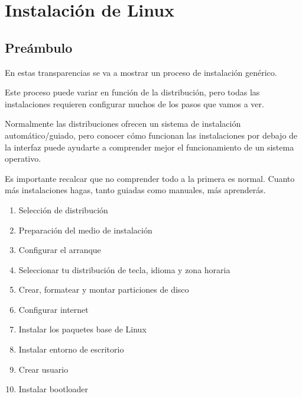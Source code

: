 \chapter{Instalación de Linux}
\section{Preámbulo}
En estas transparencias se va a mostrar un proceso de  instalación genérico.

Este proceso puede variar en función de la distribución, pero todas las instalaciones requieren configurar muchos de los pasos que vamos a ver.

Normalmente las distribuciones ofrecen un sistema de instalación automático/guiado, pero conocer cómo funcionan las instalaciones por debajo de la interfaz puede ayudarte a comprender mejor el funcionamiento de un sistema operativo.

Es importante recalcar que no comprender todo a la primera es normal. Cuanto más instalaciones hagas, tanto guiadas como manuales, más aprenderás.

\begin{enumerate}
    \item Selección de distribución
    \item Preparación del medio de instalación
    \item Configurar el arranque
    \item Seleccionar tu distribución de tecla, idioma y zona horaria
    \item Crear, formatear y montar particiones de disco
    \item Configurar internet
    \item Instalar los paquetes base de Linux
    \item Instalar entorno de escritorio
    \item Crear usuario
    \item Instalar bootloader
\end{enumerate}

